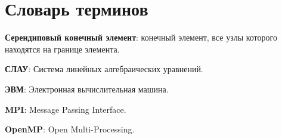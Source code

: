 \chapter*{Словарь терминов}             %

\textbf{Серендиповый конечный элемент}: конечный элемент, все узлы которого находятся на границе элемента.

\textbf{СЛАУ}: Система линейных алгебраических уравнений.

\textbf{ЭВМ}: Электронная вычислительная машина.

\textbf{MPI}: Message Passing Interface.

\textbf{OpenMP}: Open Multi-Processing.